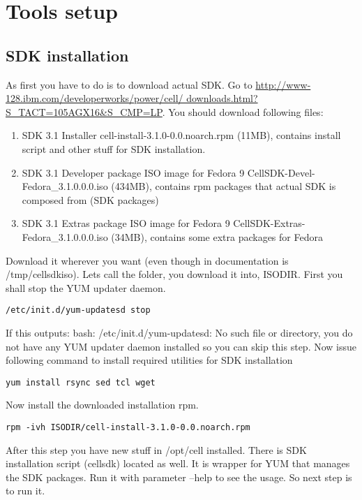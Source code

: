 \chapter{Tools setup}
\label{toolsSetup}

\section{SDK installation}

As first you have to do is to download actual SDK.
Go to \url{http://www-128.ibm.com/developerworks/power/cell/ downloads.html?S_TACT=105AGX16&S_CMP=LP}.
You should download following files:

\begin{enumerate}
\item SDK 3.1 Installer
cell-install-3.1.0-0.0.noarch.rpm  (11MB), contains install script and other stuff for SDK installation.
\item SDK 3.1 Developer package ISO image for Fedora 9
CellSDK-Devel-Fedora\_3.1.0.0.0.iso  (434MB), contains rpm packages that actual SDK is composed from (SDK packages)
\item SDK 3.1 Extras package ISO image for Fedora 9
CellSDK-Extras-Fedora\_3.1.0.0.0.iso  (34MB), contains some extra packages for Fedora
\end{enumerate}

Download it wherever you want (even though in documentation is /tmp/cellsdkiso).
Lets call the folder, you download it into, ISODIR.
First you shall stop the YUM updater daemon.

\begin{verbatim}
/etc/init.d/yum-updatesd stop
\end{verbatim}

If this outputs: bash: /etc/init.d/yum-updatesd: No such file or directory, you do not have any YUM updater daemon installed so you can skip this step.
Now issue following command to install required utilities for SDK installation

\begin{verbatim}
yum install rsync sed tcl wget
\end{verbatim}

Now install the downloaded installation rpm.

\begin{verbatim}
rpm -ivh ISODIR/cell-install-3.1.0-0.0.noarch.rpm
\end{verbatim}

After this step you have new stuff in /opt/cell installed. There is SDK installation script (cellsdk) located as well.
It is wrapper for YUM that manages the SDK packages. Run it with parameter --help to see the usage.
So next step is to run it.

